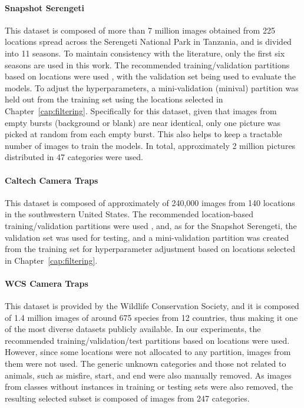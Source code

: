 \paragraph{\textbf{Snapshot Serengeti}~\citep{dryad_5pt92}} This dataset is
composed of more than 7 million images obtained from 225 locations spread
across the Serengeti National Park in Tanzania, and is divided into 11 seasons.
To maintain consistency with the literature, only the first six seasons are used
in this work. The recommended training/validation partitions based on locations
were used \citep{ss_lila}, with the validation set being used to evaluate the
models. To adjust the hyperparameters, a mini-validation (minival) partition
was held out from the training set using the locations selected in
Chapter~\ref{cap:filtering}. Specifically for this dataset, given that images
from empty bursts (background or blank) are near identical, only one picture was
picked at random from each empty burst.  This also helps to keep a tractable
number of images to train the models. In total, approximately 2 million pictures
distributed in 47 categories were used.

\paragraph{\textbf{Caltech Camera Traps}~\citep{beery2018recognition}} This
dataset is composed of approximately of 240,000 images from 140 locations in
the southwestern United States. The recommended location-based
training/validation partitions were used \citep{caltech_lila}, and, as for the
Snapshot Serengeti, the validation set was used for testing, and a
mini-validation partition was created from the training set for hyperparameter
adjustment based on locations selected in
Chapter~\ref{cap:filtering}.

\paragraph{\textbf{WCS Camera Traps}~\citep{wcs_lila}} This dataset is provided
by the Wildlife Conservation Society, and it is composed of 1.4 million images
of around 675 species from 12 countries, thus making it one of the most diverse
datasets publicly available. In our experiments, the recommended
training/validation/test partitions based on locations were used. However,
since some locations were not allocated to any partition, images from them were
not used. The generic unknown categories and those not related to animals, such
as misfire, start, and end were also manually removed. As images from classes
without instances in training or testing sets were also removed, the resulting
selected subset is composed of images from 247 categories.

